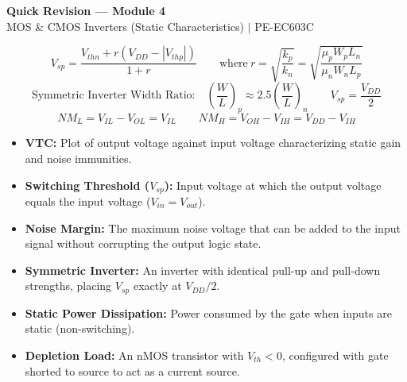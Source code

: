 \documentclass[12pt,a4paper]{article}
\begin{document}
\newpage
\begin{center}
  {\large\bfseries\color{myred} Quick Revision --- Module 4}\\[3pt]
  {\small\color{mydark} MOS \& CMOS Inverters (Static Characteristics) $|$ PE-EC603C}
\end{center}
\noindent{\color{myred}\rule{\linewidth}{1.2pt}}
\vspace{4pt}

\begin{tcolorbox}[formulabox, title={\textbf{Key Inverter Equations}}]
$$V_{sp} = \frac{V_{thn} + r(V_{DD} - |V_{thp}|)}{1 + r} \qquad \text{where} \ r = \sqrt{\frac{k_p}{k_n}} = \sqrt{\frac{\mu_p W_p L_n}{\mu_n W_n L_p}}$$
$$\text{Symmetric Inverter Width Ratio:} \quad \left(\frac{W}{L}\right)_p \approx 2.5 \left(\frac{W}{L}\right)_n \qquad V_{sp} = \frac{V_{DD}}{2}$$
$$NM_L = V_{IL} - V_{OL} = V_{IL} \qquad NM_H = V_{OH} - V_{IH} = V_{DD} - V_{IH}$$
\end{tcolorbox}

\begin{tcolorbox}[defbox, title={\textbf{One-Line Definitions}}]
\begin{itemize}[leftmargin=*, itemsep=2.5pt, topsep=0pt]
  \item \textbf{VTC:} Plot of output voltage against input voltage characterizing static gain and noise immunities.
  \item \textbf{Switching Threshold ($V_{sp}$):} Input voltage at which the output voltage equals the input voltage ($V_{in} = V_{out}$).
  \item \textbf{Noise Margin:} The maximum noise voltage that can be added to the input signal without corrupting the output logic state.
  \item \textbf{Symmetric Inverter:} An inverter with identical pull-up and pull-down strengths, placing $V_{sp}$ exactly at $V_{DD}/2$.
  \item \textbf{Static Power Dissipation:} Power consumed by the gate when inputs are static (non-switching).
  \item \textbf{Depletion Load:} An nMOS transistor with $V_{th} < 0$, configured with gate shorted to source to act as a current source.
\end{itemize}
\end{tcolorbox}
\end{document}
